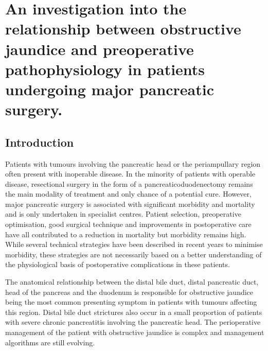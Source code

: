 
\chapter{An investigation into the relationship between obstructive jaundice and preoperative pathophysiology in patients undergoing major pancreatic surgery.}

\label{ch_cpet_jaundice}


\clearpage


\section{Introduction}
Patients with tumours involving the pancreatic head or the periampullary region often present with inoperable disease. In the minority of patients with operable disease, resectional surgery in the form of a pancreaticoduodenectomy remains the main modality of treatment and only chance of a potential cure. However, major pancreatic surgery is associated with significant morbidity and mortality and is only undertaken in specialist centres. Patient selection, preoperative optimisation, good surgical technique and improvements in postoperative care have all contributed to a reduction in mortality\parencite{winter_1423_2006} but morbidity remains high. While several technical strategies have been described in recent years to minimise morbidity, these strategies are not necessarily based on a better understanding of the physiological basis of postoperative complications in these patients.

The anatomical relationship between the distal bile duct, distal pancreatic duct, head of the pancreas and the duodenum is responsible for obstructive jaundice being the most common presenting symptom in patients with tumours affecting this region. Distal bile duct strictures also occur in a small proportion of patients with severe chronic pancreatitis involving the pancreatic head. The perioperative management of the patient with obstructive jaundice is complex and management algorithms are still evolving. 

